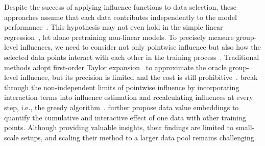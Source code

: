 Despite the success of applying influence functions to data selection, these approaches assume that each data contributes independently to the model performance~\cite{engstrom2024dsdm,yu2024mates}. This hypothesis may not even hold in the simple linear regression~\cite{saunshi2022understanding,hu2024most}, let alone pretraining non-linear models. To precisely measure group-level influences, we need to consider not only pointwise influence but also how the selected data points interact with each other in the training process~\cite{wang2024capturing}. Traditional methods adopt first-order Taylor expansion~\cite{koh2019accuracy} to approximate the oracle group-level influence, but its precision is limited and the cost is still prohibitive~\cite{grosse2023studyinginfluence}. \citet{wang2024greats} break through the non-independent limits of pointwise influence by incorporating interaction terms into influence estimation and recalculating influences at every step, i.e., the greedy algorithm~\cite{nemhauser1978analysis}. 
\citet{wang2024capturing} further propose data value embeddings to quantify the cumulative and interactive effect of one data with other training points.
Although providing valuable insights, their findings are limited to small-scale setups, and scaling their method to a larger data pool remains challenging.

